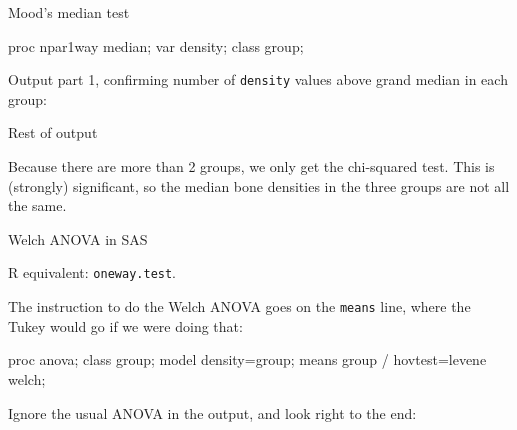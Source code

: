 \documentclass[unknownkeysallowed]{beamer}\usepackage[]{graphicx}\usepackage[]{color}
\begin{document}
\begin{frame}[fragile]{Mood's median test}
  
  \begin{Sascode}[store=ja]
proc npar1way median;
  var density;
  class group;
  \end{Sascode}
  
  Output part 1, confirming number of \texttt{density} values above
  grand median in each group:
  
  
\end{frame}

\begin{frame}[fragile]{Rest of output}
  
  
Because there are more than 2 groups, we only get the chi-squared
test. This is (strongly) significant, so the median bone densities in
the three groups are not all the same.

\end{frame}

\begin{frame}[fragile]{Welch ANOVA in SAS}
  
R equivalent: \texttt{oneway.test}.  
  
The instruction to do the Welch ANOVA
goes on the \texttt{means} line, where the Tukey would go if we were
doing that:

\begin{Sascode}[store=jc]
proc anova;
  class group;
  model density=group;
  means group / hovtest=levene welch;
\end{Sascode}

Ignore the usual ANOVA in the output, and look right to the end:
  
\end{frame}
\end{document}
